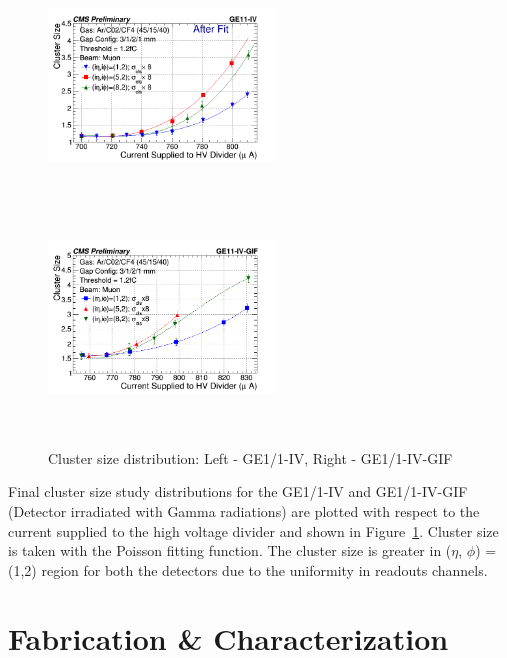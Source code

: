 \begin{figure}[!htbp]
   \begin{center}
     \includegraphics[width=6cm,height=6cm]{figures/GEM/CurrentvsClusterSizeAll3EtaPhi.png}
     \includegraphics[width=6cm,height=6cm]{figures/GEM/CurrentvsClusterSizeAll3EtaPhiGE11IVGIF.png}
   \end{center}
   \caption{Cluster size distribution: Left - GE1/1-IV, Right - GE1/1-IV-GIF}
   \label{fig:CSDGE1/1}
\end{figure}
Final cluster size study distributions for the GE1/1-IV and GE1/1-IV-GIF (Detector irradiated with Gamma radiations) are plotted with respect to the current supplied to the high voltage divider and shown in Figure~\ref{fig:CSDGE1/1}.
Cluster size is taken with the Poisson fitting function. The cluster size is greater in ($\eta$, $\phi$) = (1,2) region for both the detectors due to the uniformity in readouts channels.



\section{Fabrication \& Characterization} %
\label{sec:fabrication_&_characterization}

